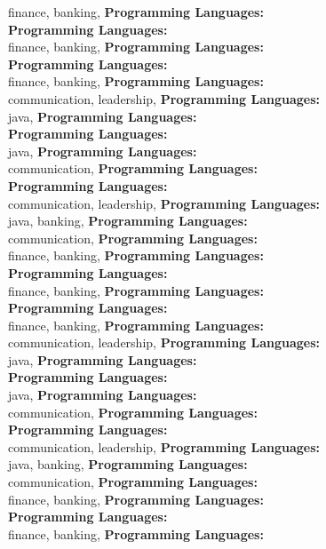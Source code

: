 finance, banking, \textbf{Programming Languages:} \\
\textbf{Programming Languages:} \\
finance, banking, \textbf{Programming Languages:} \\
\textbf{Programming Languages:} \\
finance, banking, \textbf{Programming Languages:} \\
communication, leadership, \textbf{Programming Languages:} \\
java, \textbf{Programming Languages:} \\
\textbf{Programming Languages:} \\
java, \textbf{Programming Languages:} \\
communication, \textbf{Programming Languages:} \\
\textbf{Programming Languages:} \\
communication, leadership, \textbf{Programming Languages:} \\
java, banking, \textbf{Programming Languages:} \\
communication, \textbf{Programming Languages:} \\
finance, banking, \textbf{Programming Languages:} \\
\textbf{Programming Languages:} \\
finance, banking, \textbf{Programming Languages:} \\
\textbf{Programming Languages:} \\
finance, banking, \textbf{Programming Languages:} \\
communication, leadership, \textbf{Programming Languages:} \\
java, \textbf{Programming Languages:} \\
\textbf{Programming Languages:} \\
java, \textbf{Programming Languages:} \\
communication, \textbf{Programming Languages:} \\
\textbf{Programming Languages:} \\
communication, leadership, \textbf{Programming Languages:} \\
java, banking, \textbf{Programming Languages:} \\
communication, \textbf{Programming Languages:} \\
finance, banking, \textbf{Programming Languages:} \\
\textbf{Programming Languages:} \\
finance, banking, \textbf{Programming Languages:} \\
